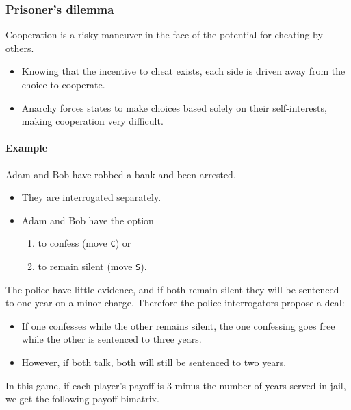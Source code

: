 \documentclass[
]{book}
\begin{document}
\hypertarget{prisoners-dilemma}{%
\subsubsection{Prisoner's dilemma}\label{prisoners-dilemma}}

Cooperation is a risky maneuver in the face of the potential for cheating by others.

\begin{itemize}
\item
  Knowing that the incentive to cheat exists, each side is driven away from the choice to cooperate.
\item
  Anarchy forces states to make choices based solely on their self-interests, making cooperation very difficult.
\end{itemize}

\hypertarget{example}{%
\paragraph{Example}\label{example}}

Adam and Bob have robbed a bank and been arrested.

\begin{itemize}
\item
  They are interrogated separately.
\item
  Adam and Bob have the option

  \begin{enumerate}
  \def\labelenumi{\arabic{enumi}.}
  \item
    to confess (move \texttt{C}) or
  \item
    to remain silent (move \texttt{S}).
  \end{enumerate}
\end{itemize}

The police have little evidence, and if both remain silent they will be sentenced to one year on a minor charge. Therefore the police interrogators propose a deal:

\begin{itemize}
\item
  If one confesses while the other remains silent, the one confessing goes free while the other is sentenced to three years.
\item
  However, if both talk, both will still be sentenced to two years.
\end{itemize}

In this game, if each player's payoff is 3 minus the number of years served in jail, we get the following payoff bimatrix.
\end{document}

